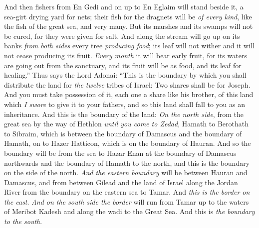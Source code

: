 \begin{biblechapter}
\verse And then fishers from En Gedi and on up to En Eglaim will stand beside it, a sea-girt drying yard for nets; their fish for the dragnets will be \textit{of every kind}, like the fish of the great sea, and very many.
\verse But its marshes and its swamps will not be cured, for they were given for salt.
\verse And along the stream will go up on its banks \textit{from both sides} every tree \textit{producing food}; its leaf will not wither and it will not cease producing its fruit. \textit{Every month} it will bear early fruit, for its waters are going out from the sanctuary, and its fruit will be as food, and its leaf for healing.”
\verse Thus says the Lord Adonai: “This is the boundary by which you shall distribute the land for \textit{the twelve} tribes of Israel: Two shares shall be for Joseph.
\verse And you must take possession of it, each one a share like his brother, of this land which \textit{I swore} to give it to your fathers, and so this land shall fall to you as an inheritance.
\verse And this is the boundary of the land: \textit{On the north side}, from the great sea by the way of Hethlon \textit{until you come to Zedad},
\verse Hamath to Berothath to Sibraim, which is between the boundary of Damascus and the boundary of Hamath, on to Hazer Hatticon, which is on the boundary of Hauran.
\verse And so the boundary will be from the sea to Hazar Enan at the boundary of Damascus northwards and the boundary of Hamath to the north, and this is the boundary on the side of the north.
\verse \textit{And the eastern boundary} will be between Hauran and Damascus, and from between Gilead and the land of Israel along the Jordan River from the boundary on the eastern sea to Tamar. And \textit{this is the border on the east}.
\verse \textit{And on the south side the border} will run from Tamar up to the waters of Meribot Kadesh and along the wadi to the Great Sea. And this is \textit{the boundary to the south}.

\end{biblechapter}
